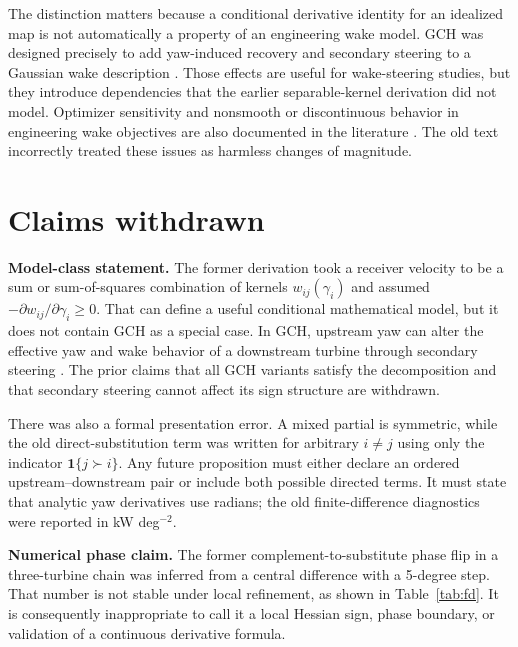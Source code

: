 \documentclass[wes, manuscript]{copernicus}
\begin{document}
The distinction matters because a conditional derivative identity for an idealized map is not automatically a property of an engineering wake model. GCH was designed precisely to add yaw-induced recovery and secondary steering to a Gaussian wake description \citep{king2021control}. Those effects are useful for wake-steering studies, but they introduce dependencies that the earlier separable-kernel derivation did not model. Optimizer sensitivity and nonsmooth or discontinuous behavior in engineering wake objectives are also documented in the literature \citep{gori2023sensitivity}. The old text incorrectly treated these issues as harmless changes of magnitude.

\section{Claims withdrawn}
\label{sec:withdrawn}

\textbf{Model-class statement.} The former derivation took a receiver velocity to be a sum or sum-of-squares combination of kernels $w_{ij}(\gamma_i)$ and assumed $-\partial w_{ij}/\partial\gamma_i\geq0$. That can define a useful conditional mathematical model, but it does not contain GCH as a special case. In GCH, upstream yaw can alter the effective yaw and wake behavior of a downstream turbine through secondary steering \citep{king2021control}. The prior claims that all GCH variants satisfy the decomposition and that secondary steering cannot affect its sign structure are withdrawn.

There was also a formal presentation error. A mixed partial is symmetric, while the old direct-substitution term was written for arbitrary $i\ne j$ using only the indicator $\mathbf{1}\{j\succ i\}$. Any future proposition must either declare an ordered upstream--downstream pair or include both possible directed terms. It must state that analytic yaw derivatives use radians; the old finite-difference diagnostics were reported in kW deg$^{-2}$.

\textbf{Numerical phase claim.} The former complement-to-substitute phase flip in a three-turbine chain was inferred from a central difference with a 5-degree step. That number is not stable under local refinement, as shown in Table~\ref{tab:fd}. It is consequently inappropriate to call it a local Hessian sign, phase boundary, or validation of a continuous derivative formula.
\end{document}
